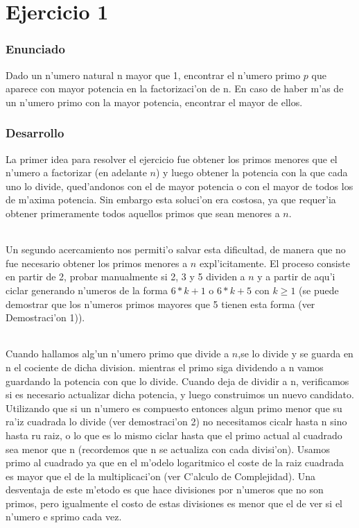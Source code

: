 \part{Ejercicio 1}
\section{Enunciado}
Dado un n'umero natural n mayor que 1, encontrar el n'umero primo $p$ que aparece con mayor potencia en la factorizaci'on 
de n. En caso de haber m'as de un n'umero primo con  la mayor potencia, encontrar el mayor de ellos.

\section{Desarrollo}
La primer idea para resolver el ejercicio fue obtener los primos menores que el n'umero a factorizar
(en adelante $n$) y luego obtener la potencia con la que cada uno lo divide, qued'andonos con el de mayor
potencia o con el mayor de todos los de m'axima potencia. Sin embargo esta soluci'on era costosa, ya que
requer'ia obtener primeramente todos aquellos primos que sean menores a $n$.
\paragraph{}
Un segundo acercamiento nos permiti'o salvar esta dificultad, de manera que no fue necesario obtener 
los primos menores a $n$ expl'icitamente. El proceso consiste en partir de 2, probar manualmente si 2, 3 y 5 
dividen a $n$ y a partir  de aqu'i ciclar generando n'umeros de la forma $6*k + 1$ o $6*k + 5$ con $k \geq 1$ 
(se puede demostrar que los n'umeros primos mayores que 5 tienen esta forma (ver Demostraci'on 1)).
\paragraph{}
Cuando hallamos alg'un n'umero primo que divide a $n$,se lo divide y se guarda en n el cociente de dicha division. mientras el primo siga dividendo a n vamos guardando la potencia con que lo divide. Cuando deja de dividir a n, verificamos si es necesario actualizar dicha potencia, y luego construimos un nuevo candidato. Utilizando que si un n'umero es compuesto entonces algun primo menor que su ra'iz cuadrada lo divide (ver demostraci'on 2) no necesitamos cicalr hasta n sino hasta ru raiz, o lo que es lo mismo ciclar hasta que el primo actual al cuadrado sea menor que n (recordemos que n se actualiza con cada divisi'on). Usamos primo al cuadrado ya que en el m'odelo logaritmico el coste de la raiz cuadrada es mayor que el de la multiplicaci'on (ver C'alculo de Complejidad). Una desventaja de este m'etodo es que hace divisiones por n'umeros que no son primos, pero igualmente el costo de estas divisiones es menor que el de ver si el n'umero e sprimo cada vez.
